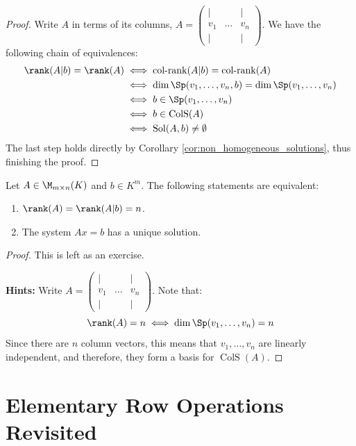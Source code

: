\begin{proof}
Write $A$ in terms of its columns, $A = \begin{pmatrix} | & & | \\ v_1 & \dots & v_n \\ | & & | \end{pmatrix}$. We have the following chain of equivalences:
\begin{align*}
    \rank(A|b) = \rank(A) &\iff \operatorname{col-rank}(A|b) = \operatorname{col-rank}(A) \\
    &\iff \dim \Sp(v_1, \dots, v_n, b) = \dim \Sp(v_1, \dots, v_n) \\
    &\iff b \in \Sp(v_1, \dots, v_n) \\
    &\iff b \in \operatorname{ColS}(A) \\
    &\iff \operatorname{Sol}(A, b) \neq \emptyset
\end{align*}
The last step holds directly by Corollary \ref{cor:non_homogeneous_solutions}, thus finishing the proof.
\end{proof}

\begin{proposition}
\label{prop:unique_solution_rank_criterion}
Let $A \in \M_{m \times n}(K)$ and $b \in K^m$. The following statements are equivalent:
\begin{enumerate}
    \item $\rank(A) = \rank(A|b) = n$.
    \item The system $Ax = b$ has a unique solution.
\end{enumerate}
\end{proposition}

\begin{proof}
This is left as an exercise.

\textbf{Hints:} Write $A = \begin{pmatrix} | & & | \\ v_1 & \dots & v_n \\ | & & | \end{pmatrix}$. Note that:
\begin{equation*}
    \rank(A) = n \iff \dim \Sp(v_1, \dots, v_n) = n
\end{equation*}
Since there are $n$ column vectors, this means that $v_1, \dots, v_n$ are linearly independent, and therefore, they form a basis for $\operatorname{ColS}(A)$.
\end{proof}

\section{Elementary Row Operations Revisited}

